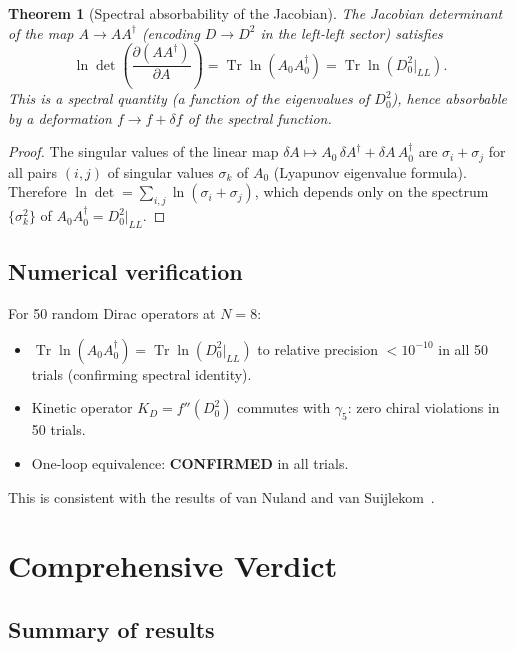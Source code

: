 \documentclass[12pt,a4paper]{article}
\newcommand{\Tr}{\operatorname{Tr}}
\newtheorem{theorem}{Theorem}[section]
\theoremstyle{definition}
\theoremstyle{remark}
\begin{document}
\begin{theorem}[Spectral absorbability of the Jacobian]
\label{thm:jacobian}
The Jacobian determinant of the map $A \to AA^\dag$ (encoding
$D \to D^2$ in the left-left sector) satisfies
\begin{equation}
  \ln\det\!\left(\frac{\partial(AA^\dag)}{\partial A}\right)
  = \Tr\ln(A_0 A_0^\dag)
  = \Tr\ln(D_0^2|_{LL}).
\end{equation}
This is a \emph{spectral} quantity (a function of the eigenvalues of
$D_0^2$), hence absorbable by a deformation $f \to f + \delta f$ of the
spectral function.
\end{theorem}

\begin{proof}
The singular values of the linear map
$\delta A \mapsto A_0\,\delta A^\dag + \delta A\, A_0^\dag$
are $\sigma_i + \sigma_j$ for all pairs $(i,j)$ of singular values
$\sigma_k$ of $A_0$ (Lyapunov eigenvalue formula).  Therefore
$\ln\det = \sum_{i,j}\ln(\sigma_i + \sigma_j)$, which depends only
on the spectrum $\{\sigma_k^2\}$ of $A_0 A_0^\dag = D_0^2|_{LL}$.
\end{proof}

\subsection{Numerical verification}

For 50 random Dirac operators at $N = 8$:
\begin{itemize}
  \item $\Tr\ln(A_0 A_0^\dag) = \Tr\ln(D_0^2|_{LL})$ to relative
    precision $< 10^{-10}$ in all 50 trials (confirming spectral identity).
  \item Kinetic operator $K_D = f''(D_0^2)$ commutes with $\gamma_5$:
    zero chiral violations in 50 trials.
  \item One-loop equivalence: \textbf{CONFIRMED} in all trials.
\end{itemize}
This is consistent with the results of van Nuland and
van Suijlekom~\cite{vanNuland2022}.

\section{Comprehensive Verdict}
\label{sec:verdict}

\subsection{Summary of results}
\end{document}

